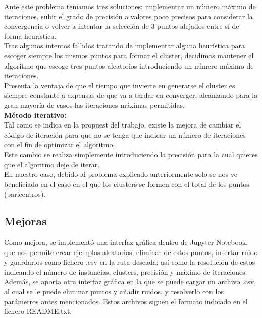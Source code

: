 \documentclass[conference,a4paper]{IEEEtran}
\begin{document}
Ante este problema teníamos tres soluciones: implementar un número máximo de iteraciones, subir el grado de precisión a valores poco precisos para considerar la convergencia o volver a intentar la selección de 3 puntos alejados entre sí de forma heurística.\\

Tras algunos intentos fallidos tratando de implementar alguna heurística para escoger siempre los mismos puntos para formar el cluster, decidimos mantener el algoritmo que escoge tres puntos aleatorios introduciendo un número máximo de iteraciones.\\

Presenta la ventaja de que el tiempo que invierte en generarse el cluster es siempre constante a expensas de que va a tardar en converger, alcanzando para la gran mayoría de casos las iteraciones máximas permitidas.\\

\textbf{Método iterativo:}\\

Tal como se indica en la propuest del trabajo, existe la mejora de cambiar el código de iteración para que no se tenga que indicar un número de iteraciones con el fin de optimizar el algoritmo.\\

Este cambio se realiza simplemente introduciendo la precisión para la cual quieres que el algoritmo deje de iterar.\\

En nuestro caso, debido al problema explicado anteriormente solo se nos ve beneficiado en el caso en el que los clusters se formen con el total de los puntos (baricentros).\\

\subsection{Mejoras}

Como mejora, se implementó una interfaz gráfica dentro de Jupyter Notebook, que nos permite crear ejemplos aleatorios, eliminar de estos puntos, insertar ruido y guardarlos como fichero .csv en la ruta deseada; así como la resolución de estos indicando el número de instancias, clusters, precisión y máximo de iteraciones. Además, se aporta otra interfaz gráfica en la que se puede cargar un archivo .csv, al cual se le puede eliminar puntos y añadir ruidos, y resolverlo con los parámetros antes mencionados. Estos archivos siguen el formato indicado en el fichero README.txt.\\
\end{document}
